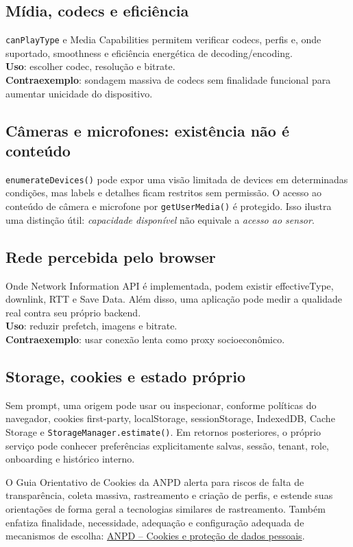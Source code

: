 \documentclass[11pt,a4paper]{article}
\begin{document}
\subsection{Mídia, codecs e eficiência}
\texttt{canPlayType} e Media Capabilities permitem verificar codecs, perfis e, onde suportado, smoothness e eficiência energética de decoding/encoding.\\
\textbf{Uso}: escolher codec, resolução e bitrate.\\
\textbf{Contraexemplo}: sondagem massiva de codecs sem finalidade funcional para aumentar unicidade do dispositivo.

\subsection{Câmeras e microfones: existência não é conteúdo}
\texttt{enumerateDevices()} pode expor uma visão limitada de devices em determinadas condições, mas labels e detalhes ficam restritos sem permissão. O acesso ao conteúdo de câmera e microfone por \texttt{getUserMedia()} é protegido. Isso ilustra uma distinção útil: \emph{capacidade disponível} não equivale a \emph{acesso ao sensor}.

\subsection{Rede percebida pelo browser}
Onde Network Information API é implementada, podem existir effectiveType, downlink, RTT e Save Data. Além disso, uma aplicação pode medir a qualidade real contra seu próprio backend.\\
\textbf{Uso}: reduzir prefetch, imagens e bitrate.\\
\textbf{Contraexemplo}: usar conexão lenta como proxy socioeconômico.

\subsection{Storage, cookies e estado próprio}
Sem prompt, uma origem pode usar ou inspecionar, conforme políticas do navegador, cookies first-party, localStorage, sessionStorage, IndexedDB, Cache Storage e \texttt{StorageManager.estimate()}. Em retornos posteriores, o próprio serviço pode conhecer preferências explicitamente salvas, sessão, tenant, role, onboarding e histórico interno.

O Guia Orientativo de Cookies da ANPD alerta para riscos de falta de transparência, coleta massiva, rastreamento e criação de perfis, e estende suas orientações de forma geral a tecnologias similares de rastreamento. Também enfatiza finalidade, necessidade, adequação e configuração adequada de mecanismos de escolha: \href{https://www.gov.br/anpd/pt-br/centrais-de-conteudo/materiais-educativos-e-publicacoes/guia_orientativo_cookies_e_protecao_de_dados_pessoais}{ANPD -- Cookies e proteção de dados pessoais}.
\end{document}
